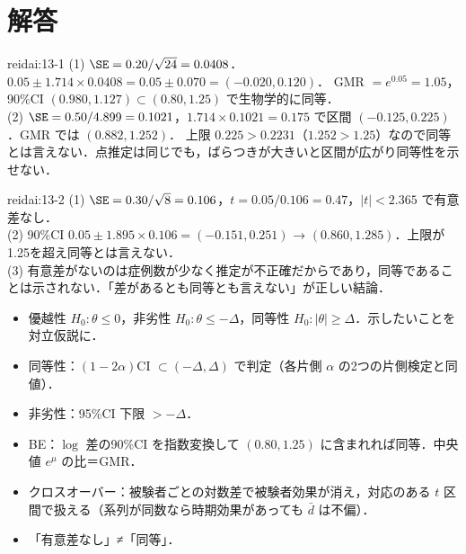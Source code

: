 \section{解答}\label{sec:13-sol}
\begin{kaitou}{reidai:13-1}
(1) $\SE=0.20/\sqrt{24}=0.0408$．$0.05\pm1.714\times0.0408=0.05\pm0.070=(-0.020,0.120)$．
GMR $=e^{0.05}=1.05$，90\%CI $(0.980,1.127)\subset(0.80,1.25)$ で生物学的に同等．\\
(2) $\SE=0.50/4.899=0.1021$，$1.714\times0.1021=0.175$ で区間 $(-0.125,0.225)$．GMR では $(0.882,1.252)$．
上限 $0.225>0.2231$（$1.252>1.25$）なので同等とは言えない．点推定は同じでも，ばらつきが大きいと区間が広がり同等性を示せない．
\end{kaitou}

\begin{kaitou}{reidai:13-2}
(1) $\SE=0.30/\sqrt8=0.106$，$t=0.05/0.106=0.47$，$|t|<2.365$ で有意差なし．\\
(2) 90\%CI $0.05\pm1.895\times0.106=(-0.151,0.251)$ → $(0.860,1.285)$．上限が1.25を超え同等とは言えない．\\
(3) 有意差がないのは症例数が少なく推定が不正確だからであり，同等であることは示されない．「差があるとも同等とも言えない」が正しい結論．
\end{kaitou}

\begin{summarybox}
\begin{itemize}
\item 優越性 $H_0:\theta\le0$，非劣性 $H_0:\theta\le-\Delta$，同等性 $H_0:|\theta|\ge\Delta$．示したいことを対立仮説に．
\item 同等性：$(1-2\alpha)$CI $\subset(-\Delta,\Delta)$ で判定（各片側 $\alpha$ の2つの片側検定と同値）．
\item 非劣性：95\%CI 下限 $>-\Delta$．
\item BE：$\log$ 差の90\%CI を指数変換して $(0.80,1.25)$ に含まれれば同等．中央値 $e^\mu$ の比＝GMR．
\item クロスオーバー：被験者ごとの対数差で被験者効果が消え，対応のある $t$ 区間で扱える（系列が同数なら時期効果があっても $\bar d$ は不偏）．
\item 「有意差なし」≠「同等」．
\end{itemize}
\end{summarybox}
